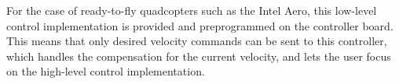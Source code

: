 For the case of ready-to-fly quadcopters such as the Intel Aero, this low-level
control implementation is provided and preprogrammed on the controller board.
This means that only desired velocity commands can be sent to this controller,
which handles the compensation for the current velocity, and lets the user
focus on the high-level control implementation.

